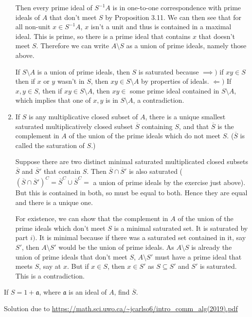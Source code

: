 \begin{questions}
\begin{enumerate}
\begin{solution}
		Then every prime ideal of $S^{-1}A $ is in one-to-one correspondence with prime ideals of $A $ that don't meet $S $ by Proposition 3.11.
		We can then see that for all non-unit $x\in S^{-1}A$, $x $ isn't a unit and thus is contained in a maximal ideal.
		This is prime, so there is a prime ideal that contains $x $ that doesn't meet $S $.
		Therefore we can write $A \setminus S $ as a union of prime ideals, namely those above.

		If $S \setminus A $ is a union of prime ideals, then $S $ is saturated because $\implies) $ if $xy\in S $ then if $x $ or $y  $ wasn't in $S $, then $xy \in S \setminus A $ by properties of ideals.
		$\Leftarrow) $ If $x,y \in S $, then if $xy \in S \setminus A$, then $xy \in $ some prime ideal contained in $S \setminus A $, which implies that one of $x,y $ is in $S \setminus A $, a contradiction.
	\end{solution}
	\item If $S$ is any multiplicative closed subset of $A $, there is a unique smallest saturated multiplicatively closed subset $\overline{S}  $ containing $S $, and that $\overline{S}  $ is the complement in $A$ of the union of the prime ideals which do not meet $S$. ($\overline{S}  $ is called the saturation of $S $.) 
	\begin{solution}
		Suppose there are two distinct minimal saturated multiplicated closed subsets $\overline{S}  $ and $\overline{S}'  $ that contain $S $.
		Then $\overline{S}\cap \overline{S}'   $ is also saturated ($(\overline{S}\cap \overline{S}')^C = \overline{S}^C \cup \overline{S}^C =    $ a union of prime ideals by the exercise just above).
		But this is contained in both, so must be equal to both.
		Hence they are equal and there is a unique one.

		For existence, we can show that the complement in $A $ of the union of the prime ideals which don't meet $S $ is a minimal saturated set.
		It is saturated by part $i) $.
		It is minimal because if there was a saturated set contained in it, say $S' $, then $A\setminus S' $ would be the union of prime ideals.
		As $A\setminus S $ is already the union of prime ideals that don't meet $S $, $A \setminus S' $ must have a prime ideal that meets $S $, say at $x $.
		But if $x\in S $, then $x \in S' $ as $S \subseteq S' $ and $S' $ is saturated.
		This is a contradiction.
	\end{solution}
\end{enumerate}
If $S = 1 + \mathfrak{a} $, where $\mathfrak{a} $ is an ideal of $A $, find $\overline{S}  $.
\begin{solution}
	Solution due to \url{https://math.sci.uwo.ca/~jcarlso6/intro_comm_alg(2019).pdf}


\end{solution}
\end{questions}

